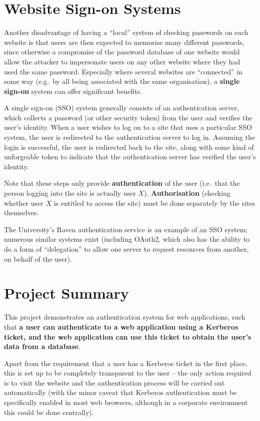 \documentclass[12pt]{report}
\begin{document}
\section{Website Sign-on Systems}
Another disadvantage of having a ``local'' system of checking passwords on each website is that users are then expected to memorise many different passwords, since otherwise a compromise of the password database of one website would allow the attacker to impersonate users on any other website where they had used the same password. Especially where several websites are ``connected'' in some way (e.g.\ by all being associated with the same organisation), a \textbf{single sign-on} system can offer significant benefits.

A single sign-on (SSO) system generally consists of an authentication server, which collects a password (or other security token) from the user and verifies the user's identity. When a user wishes to log on to a site that uses a particular SSO system, the user is redirected to the authentication server to log in. Assuming the login is successful, the user is redirected back to the site, along with some kind of unforgeable token to indicate that the authentication server has verified the user's identity.

Note that these steps only provide \textbf{authentication} of the user (i.e.\ that the person logging into the site is actually user $X$). \textbf{Authorisation} (checking whether user $X$ is entitled to access the site) must be done separately by the sites themselves.

The University's Raven authentication service is an example of an SSO system; numerous similar systems exist (including OAuth2, which also has the ability to do a form of ``delegation'' to allow one server to request resources from another, on behalf of the user\cite{Oracle-OAuth2}).

\section{Project Summary}
This project demonstrates an authentication system for web applications, such that \textbf{a user can authenticate to a web application using a Kerberos ticket, and the web application can use this ticket to obtain the user's data from a database}.

Apart from the requirement that a user has a Kerberos ticket in the first place, this is set up to be completely transparent to the user -- the only action required is to visit the website and the authentication process will be carried out automatically (with the minor caveat that Kerberos authentication must be specifically enabled in most web browsers, although in a corporate environment this could be done centrally).
\end{document}
